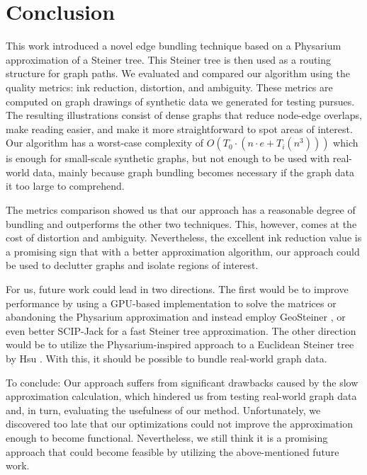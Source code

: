 
\chapter{Conclusion}
\label{sec:conclusion}

This work introduced a novel edge bundling technique based on a Physarium approximation of a Steiner tree. This Steiner tree is then used as a routing structure for graph paths. We evaluated and compared our algorithm using the quality metrics: ink reduction, distortion, and ambiguity. These metrics are computed on graph drawings of synthetic data we generated for testing pursues. The resulting illustrations consist of dense graphs that reduce node-edge overlaps, make reading easier, and make it more straightforward to spot areas of interest. Our algorithm has a worst-case complexity of $O\left(T_0 \cdot \left(n \cdot e + T_i\left(n^3\right)\right)\right)$ which is enough for small-scale synthetic graphs, but not enough to be used with real-world data, mainly because graph bundling becomes necessary if the graph data it too large to comprehend. 

The metrics comparison showed us that our approach has a reasonable degree of bundling and outperforms the other two techniques. This, however, comes at the cost of distortion and ambiguity. Nevertheless, the excellent ink reduction value is a promising sign that with a better approximation algorithm, our approach could be used to declutter graphs and isolate regions of interest. 

For us, future work could lead in two directions. The first would be to improve performance by using a GPU-based implementation to solve the matrices or abandoning the Physarium approximation and instead employ GeoSteiner \cite{winter_euclidean_1997}, or even better SCIP-Jack \cite{RehfeldtKoch2023} for a fast Steiner tree approximation. The other direction would be to utilize the Physarium-inspired approach to a Euclidean Steiner tree by Hsu \cite{hsu_physarum-inspired_2022}. With this, it should be possible to bundle real-world graph data.

To conclude: Our approach suffers from significant drawbacks caused by the slow approximation calculation, which hindered us from testing real-world graph data and, in turn, evaluating the usefulness of our method. Unfortunately, we discovered too late that our optimizations could not improve the approximation enough to become functional. 
Nevertheless, we still think it is a promising approach that could become feasible by utilizing the above-mentioned future work. 
